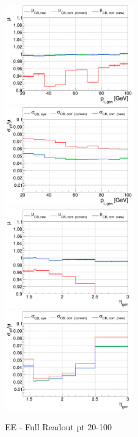\begin{figure}
\includegraphics[width=0.495\textwidth]{./plots_pdf/ECAL_plots/plotsPU/EE/FULL/pdf/GENPT/EEFULL_GENPT_0020_0100_MuOverBins.pdf}
\includegraphics[width=0.495\textwidth]{./plots_pdf/ECAL_plots/plotsPU/EE/FULL/pdf/GENPT/EEFULL_GENPT_0020_0100_EffSigmaOverBins.pdf}
\includegraphics[width=0.495\textwidth]{./plots_pdf/ECAL_plots/plotsPU/EE/FULL/pdf/GENETA/EEFULL_GENETA_0020_0100_MuOverBins.pdf}
\includegraphics[width=0.495\textwidth]{./plots_pdf/ECAL_plots/plotsPU/EE/FULL/pdf/GENETA/EEFULL_GENETA_0020_0100_EffSigmaOverBins.pdf}
\caption{EE - Full Readout pt 20-100}
\end{figure}

